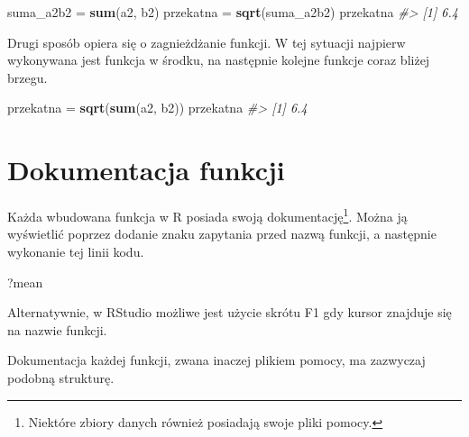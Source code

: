\documentclass[paper=6in:9in,pagesize=pdftex,headinclude=on,footinclude=on,10pt]{scrbook}
\newenvironment{Shaded}{\begin{snugshade}}{\end{snugshade}}
\newcommand{\CommentTok}[1]{\textcolor[rgb]{0.56,0.35,0.01}{\textit{#1}}}
\newcommand{\KeywordTok}[1]{\textcolor[rgb]{0.13,0.29,0.53}{\textbf{#1}}}
\newcommand{\NormalTok}[1]{#1}
\newcommand{\StringTok}[1]{\textcolor[rgb]{0.31,0.60,0.02}{#1}}
\begin{document}
\begin{Shaded}
\begin{Highlighting}[]
\NormalTok{suma_a2b2 =}\StringTok{ }\KeywordTok{sum}\NormalTok{(a2, b2)}
\NormalTok{przekatna =}\StringTok{ }\KeywordTok{sqrt}\NormalTok{(suma_a2b2)}
\NormalTok{przekatna}
\CommentTok{#> [1] 6.4}
\end{Highlighting}
\end{Shaded}

Drugi sposób opiera się o zagnieżdżanie funkcji.
W tej sytuacji najpierw wykonywana jest funkcja w środku, na następnie kolejne funkcje coraz bliżej brzegu.

\begin{Shaded}
\begin{Highlighting}[]
\NormalTok{przekatna =}\StringTok{ }\KeywordTok{sqrt}\NormalTok{(}\KeywordTok{sum}\NormalTok{(a2, b2))}
\NormalTok{przekatna}
\CommentTok{#> [1] 6.4}
\end{Highlighting}
\end{Shaded}

\hypertarget{dokumentacja-funkcji}{%
\section{Dokumentacja funkcji}\label{dokumentacja-funkcji}}

Każda wbudowana funkcja w R posiada swoją dokumentację\footnote{Niektóre zbiory danych również posiadają swoje pliki pomocy.}.
Można ją wyświetlić poprzez dodanie znaku zapytania przed nazwą funkcji, a następnie wykonanie tej linii kodu.

\begin{Shaded}
\begin{Highlighting}[]
\NormalTok{?mean}
\end{Highlighting}
\end{Shaded}

Alternatywnie, w RStudio możliwe jest użycie skrótu F1 gdy kursor znajduje się na nazwie funkcji.

Dokumentacja każdej funkcji, zwana inaczej plikiem pomocy, ma zazwyczaj podobną strukturę.
\end{document}
